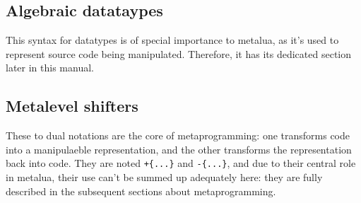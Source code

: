 \subsection{Algebraic datataypes}

This syntax for datatypes is of special importance to metalua, as it's
used to represent source code being manipulated. Therefore, it has its
dedicated section later in this manual.

\subsection{Metalevel shifters}

These to dual notations are the core of metaprogramming: one
transforms code into a manipulaeble representation, and the other
transforms the representation back into code. They are noted
{\tt+\{...\}} and {\tt-\{...\}}, and due to their central role in
metalua, their use can't be summed up adequately here: they are fully
described in the subsequent sections about metaprogramming.
